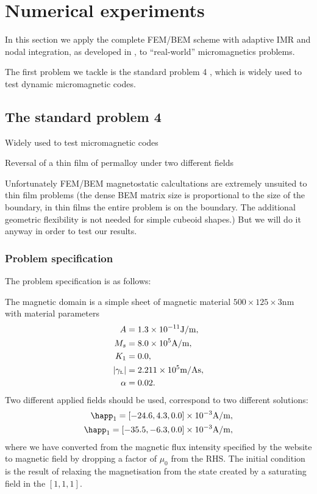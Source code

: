 \chapter{Numerical experiments}
\label{cha:numer-experiments}

In this section we apply the complete FEM/BEM scheme with adaptive IMR and nodal integration, as developed in , to ``real-world'' micromagnetics problems.

The first problem we tackle is the \mumag standard problem 4 \cite{mumag-website}, which is widely used to test dynamic micromagnetic codes.



\section{The \mumag standard problem 4}

Widely used to test micromagnetic codes

Reversal of a thin film of permalloy under two different fields

Unfortunately FEM/BEM magnetostatic calcultations are extremely unsuited to thin film problems (the dense BEM matrix size is proportional to the size of the boundary, in thin films the entire problem is on the boundary. The additional geometric flexibility is not needed for simple cubeoid shapes.)
But we will do it anyway in order to test our results.


\subsection{Problem specification}

The problem specification is as follows:

The magnetic domain is a simple sheet of magnetic material $500 \times 125 \times 3$nm with material parameters
\begin{equation}
  \begin{aligned}
    A &= 1.3\times 10^{-11} \text{J/m}, \\
    M_s &= 8.0\times 10^{5} \text{A/m}, \\
    K_1 &= 0.0, \\
    {\left|{\gamma_{\text{\tiny{L}}}} \right|} &= 2.211 \times 10^{5} \text{m/As}, \\
    \alpha &= 0.02.
  \end{aligned}
\end{equation}
Two different applied fields should be used, correspond to two different solutions:
\begin{equation}
  \begin{aligned}
    \happ_1 = [-24.6, 4.3, 0.0] \E{-3}\text{A/m}, \\
    \happ_1 = [-35.5, -6.3, 0.0] \E{-3}\text{A/m}, \\
  \end{aligned}
  \label{eq:mumag-h-app}
\end{equation}
where we have converted from the magnetic flux intensity specified by the \mumag website to magnetic field by dropping a factor of $\mu_0$ from the RHS.
The initial condition is the result of relaxing the magnetisation from the state created by a saturating field in the $[1,1,1]$.

